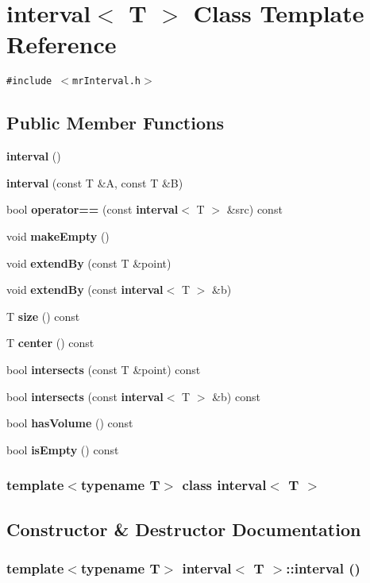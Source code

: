 \section{interval$<$ T $>$ Class Template Reference}
\label{classinterval}
{\tt \#include $<$mr\-Interval.h$>$}

\subsection*{Public Member Functions}
\begin{CompactItemize}
\item 
{\bf interval} ()
\item 
{\bf interval} (const T \&A, const T \&B)
\item 
bool {\bf operator==} (const {\bf interval}$<$ T $>$ \&src) const 
\item 
void {\bf make\-Empty} ()
\item 
void {\bf extend\-By} (const T \&point)
\item 
void {\bf extend\-By} (const {\bf interval}$<$ T $>$ \&b)
\item 
T {\bf size} () const 
\item 
T {\bf center} () const 
\item 
bool {\bf intersects} (const T \&point) const 
\item 
bool {\bf intersects} (const {\bf interval}$<$ T $>$ \&b) const 
\item 
bool {\bf has\-Volume} () const 
\item 
bool {\bf is\-Empty} () const 
\end{CompactItemize}
\subsubsection*{template$<$typename T$>$ class interval$<$ T $>$}



\subsection{Constructor \& Destructor Documentation}
\subsubsection{\setlength{\rightskip}{0pt plus 5cm}template$<$typename T$>$ {\bf interval}$<$ T $>$::{\bf interval} ()}\label{classinterval_a0}


